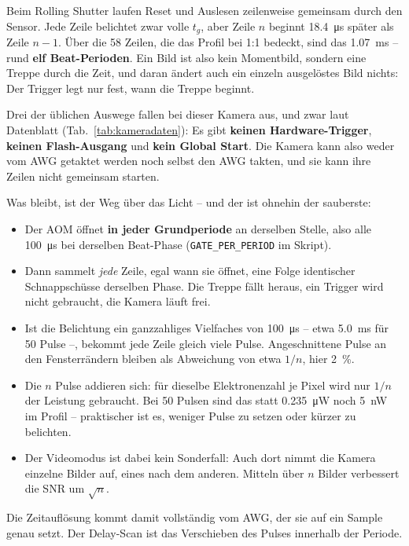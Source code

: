 \documentclass[11pt,a4paper]{article}
\begin{document}
Beim Rolling Shutter laufen Reset und Auslesen zeilenweise gemeinsam durch den
Sensor. Jede Zeile belichtet zwar volle $t_g$, aber Zeile $n$ beginnt
\SI{18,4}{\micro\second} sp\"ater als Zeile $n-1$. \"Uber die 58 Zeilen, die das
Profil bei 1:1 bedeckt, sind das \SI{1,07}{\milli\second} -- rund
\textbf{elf Beat-Perioden}. Ein Bild ist also kein Momentbild, sondern eine
Treppe durch die Zeit, und daran \"andert auch ein einzeln ausgel\"ostes Bild
nichts: Der Trigger legt nur fest, wann die Treppe beginnt.

Drei der \"ublichen Auswege fallen bei dieser Kamera aus, und zwar laut
Datenblatt (Tab.~\ref{tab:kameradaten}): Es gibt \textbf{keinen
Hardware-Trigger}, \textbf{keinen Flash-Ausgang} und \textbf{kein Global
Start}. Die Kamera kann also weder vom AWG getaktet werden noch selbst den AWG
takten, und sie kann ihre Zeilen nicht gemeinsam starten.

Was bleibt, ist der Weg \"uber das Licht -- und der ist ohnehin der sauberste:
\begin{itemize}
\item Der AOM \"offnet \textbf{in jeder Grundperiode} an derselben Stelle, also
  alle \SI{100}{\micro\second} bei derselben Beat-Phase
  (\texttt{GATE\_PER\_PERIOD} im Skript).
\item Dann sammelt \emph{jede} Zeile, egal wann sie \"offnet, eine Folge
  identischer Schnappschüsse derselben Phase. Die Treppe f\"allt heraus, ein
  Trigger wird nicht gebraucht, die Kamera l\"auft frei.
\item Ist die Belichtung ein ganzzahliges Vielfaches von \SI{100}{\micro\second}
  -- etwa \SI{5,0}{\milli\second} f\"ur 50 Pulse --, bekommt jede Zeile gleich
  viele Pulse. Angeschnittene Pulse an den Fensterr\"andern bleiben als
  Abweichung von etwa $1/n$, hier \SI{2}{\percent}.
\item Die $n$ Pulse addieren sich: f\"ur dieselbe Elektronenzahl je Pixel wird
  nur $1/n$ der Leistung gebraucht. Bei 50 Pulsen sind das statt
  \SI{0,235}{\micro\watt} noch \SI{5}{\nano\watt} im Profil -- praktischer ist
  es, weniger Pulse zu setzen oder k\"urzer zu belichten.
\item Der Videomodus ist dabei kein Sonderfall: Auch dort nimmt die Kamera
  einzelne Bilder auf, eines nach dem anderen. Mitteln \"uber $n$ Bilder
  verbessert die SNR um $\sqrt{n}$.
\end{itemize}

Die Zeitaufl\"osung kommt damit vollst\"andig vom AWG, der sie auf ein Sample
genau setzt. Der Delay-Scan ist das Verschieben des Pulses innerhalb der
Periode.
\end{document}
